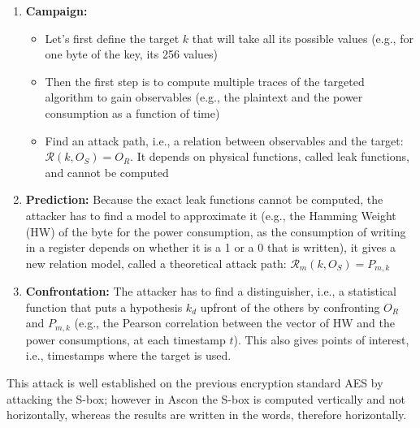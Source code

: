 \documentclass[11pt,technote]{IEEEtran}
\begin{document}
		\begin{enumerate}
			\item \textbf{Campaign:}
			\begin{itemize}
				\item Let's first define the target $k$ that will take all its possible values (e.g., for one byte of the key, its 256 values)
				\item Then the first step is to compute multiple traces of the targeted algorithm to gain observables (e.g., the plaintext and the power consumption as a function of time)
				\item Find an attack path, i.e., a relation between observables and the target: $\mathcal{R}(k,O_S) = O_R$. It depends on physical functions, called leak functions, and cannot be computed
			\end{itemize}
			\item \textbf{Prediction:} Because the exact leak functions cannot be computed, the attacker has to find a model to approximate it (e.g., the Hamming Weight (HW) of the byte for the power consumption, as the consumption of writing in a register depends on whether it is a 1 or a 0 that is written), it gives a new relation model, called a theoretical attack path: $\mathcal{R}_m(k,O_S) = P_{m,k}$
			\item \textbf{Confrontation:} The attacker has to find a distinguisher, i.e., a statistical function that puts a hypothesis $k_d$ upfront of the others by confronting $O_R$ and $P_{m,k}$ (e.g., the Pearson correlation between the vector of HW and the power consumptions, at each timestamp $t$). This also gives points of interest, i.e., timestamps where the target is used.
		\end{enumerate}

		This attack is well established on the previous encryption standard AES \cite{cpa_aes,aes} by attacking the S-box; however in Ascon the S-box is computed vertically and not horizontally, whereas the results are written in the words, therefore horizontally.
		
\end{document}

